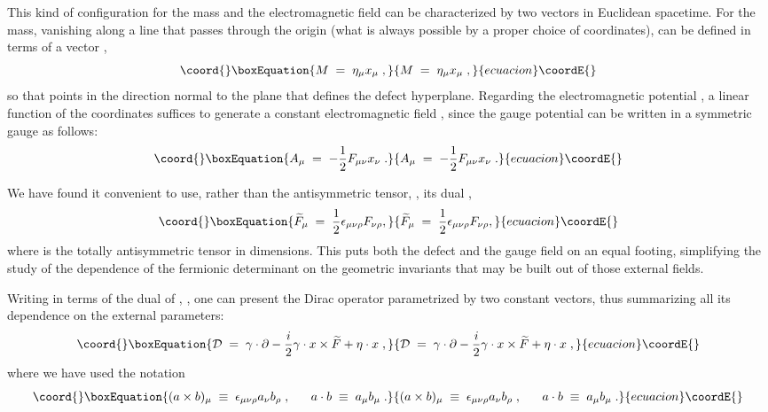 \documentclass[a4paper,12pt]{article}
\providecommand{\Fd}{\widetilde{F}}
\providecommand{\n}{\eta}
\begin{document}
This kind of configuration for the mass and the electromagnetic field
can be characterized by two vectors in Euclidean spacetime. For the
mass, vanishing along a line that passes through the origin (what is
always possible by a proper choice of coordinates), can be defined in
terms of a vector \myHighlight{$\n_\mu$}\coordHE{},
\begin{equation}\coord{}\boxEquation{\label{M}
M\;=\;\n_\mu x_\mu \;,
}{M\;=\;\n_\mu x_\mu \;,
}{ecuacion}\coordE{}\end{equation}
so that \myHighlight{$\n_\mu$}\coordHE{} points in the direction normal to the plane that
defines the defect hyperplane.  Regarding the electromagnetic
potential \coordHE{}, a linear function of the coordinates suffices to
generate a constant electromagnetic field \coordHE{}, since the gauge
potential can be written in a symmetric gauge as follows:
\begin{equation}\coord{}\boxEquation{\label{A}
A_\mu\;=\;-\frac{1}{2}F_{\mu\nu}x_\nu \;.
}{A_\mu\;=\;-\frac{1}{2}F_{\mu\nu}x_\nu \;.
}{ecuacion}\coordE{}\end{equation}

We have found it convenient to use, rather than the antisymmetric
tensor, \coordHE{}, its dual \myHighlight{$\Fd_\mu$}\coordHE{},
\begin{equation}\coord{}\boxEquation{\label{Fd}
\Fd_\mu\;=\;\frac{1}{2}\epsilon_{\mu\nu\rho}F_{\nu\rho},
}{\Fd_\mu\;=\;\frac{1}{2}\epsilon_{\mu\nu\rho}F_{\nu\rho},
}{ecuacion}\coordE{}\end{equation}
where \myHighlight{$\epsilon_{\mu\nu\rho}$}\coordHE{} is the totally antisymmetric tensor in \coordHE{} dimensions.
This puts both the defect and the gauge field on an equal footing,
simplifying the study of the dependence of the fermionic determinant
on the geometric invariants that may be built out of those external
fields.

Writing \coordHE{} in terms of the dual of \coordHE{}, \myHighlight{$A_\mu=\frac{1}{2}
\epsilon_{\mu\nu\rho} \Fd_\rho x_\nu$}\coordHE{}, one can present the Dirac operator parametrized by
two constant vectors, thus summarizing all its dependence on the
external parameters:
\begin{equation}\coord{}\boxEquation{\label{D}
{\mathcal D}\;=\;\gamma \cdot \partial - \frac{i}{2} \gamma \cdot x \times \Fd + \n \cdot x \;,
}{{\mathcal D}\;=\;\gamma \cdot \partial - \frac{i}{2} \gamma \cdot x \times \Fd + \n \cdot x \;,
}{ecuacion}\coordE{}\end{equation}
where we have used the notation
\begin{equation}\coord{}\boxEquation{\label{productos}
(a \times b)_\mu \;\equiv\; \epsilon_{\mu\nu\rho} a_\nu b_\rho\; ,
\;\;\;\;\;\;  a \cdot b\;\equiv\;a_\mu b_\mu \;.
}{(a \times b)_\mu \;\equiv\; \epsilon_{\mu\nu\rho} a_\nu b_\rho\; ,
\;\;\;\;\;\;  a \cdot b\;\equiv\;a_\mu b_\mu \;.
}{ecuacion}\coordE{}\end{equation}
\end{document}
